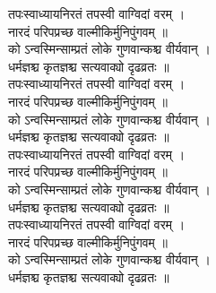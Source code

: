 \documentclass[12pt]{book}
\begin{document}



\vfill
\pagebreak

\noindent
\textsanskrit{\large 
तपःस्वाध्यायनिरतं तपस्वी वाग्विदां वरम् ।\\
नारदं परिपप्रच्छ वाल्मीकिर्मुनिपुंगवम् ॥\\
को ऽन्वस्मिन्साम्प्रतं लोके गुणवान्कश्च वीर्यवान् ।\\
धर्मज्ञश्च कृतज्ञश्च सत्यवाक्यो दृढव्रतः ॥ \\
तपःस्वाध्यायनिरतं तपस्वी वाग्विदां वरम् ।\\
नारदं परिपप्रच्छ वाल्मीकिर्मुनिपुंगवम् ॥\\
को ऽन्वस्मिन्साम्प्रतं लोके गुणवान्कश्च वीर्यवान् ।\\
धर्मज्ञश्च कृतज्ञश्च सत्यवाक्यो दृढव्रतः ॥ \\
तपःस्वाध्यायनिरतं तपस्वी वाग्विदां वरम् ।\\
नारदं परिपप्रच्छ वाल्मीकिर्मुनिपुंगवम् ॥\\
को ऽन्वस्मिन्साम्प्रतं लोके गुणवान्कश्च वीर्यवान् ।\\
धर्मज्ञश्च कृतज्ञश्च सत्यवाक्यो दृढव्रतः ॥ \\
तपःस्वाध्यायनिरतं तपस्वी वाग्विदां वरम् ।\\
नारदं परिपप्रच्छ वाल्मीकिर्मुनिपुंगवम् ॥\\
को ऽन्वस्मिन्साम्प्रतं लोके गुणवान्कश्च वीर्यवान् ।\\
धर्मज्ञश्च कृतज्ञश्च सत्यवाक्यो दृढव्रतः ॥ 
}
\end{document}
